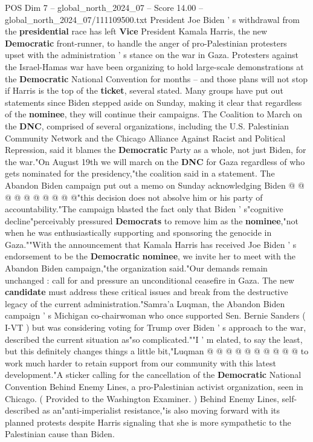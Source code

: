 \begin{textsample}{POS Dim 7 – global\_north\_2024\_07 – Score 14.00 – global\_north\_2024\_07/111109500.txt}  \label{ex:f7_pos_042}
President Joe Biden ' s withdrawal from the \textbf{presidential} race has left \textbf{Vice} President Kamala Harris, the new \textbf{Democratic} front-runner, to handle the anger of pro-Palestinian protesters upset with the administration ' s stance on the war in Gaza.
Protesters against the Israel-Hamas war have been organizing to hold large-scale demonstrations at the \textbf{Democratic} National Convention for months -- and those plans will not stop if Harris is the top of the \textbf{ticket}, several stated.
Many groups have put out statements since Biden stepped aside on Sunday, making it clear that regardless of the \textbf{nominee}, they will continue their campaigns.
The Coalition to March on the \textbf{DNC}, comprised of several organizations, including the U.S.
Palestinian Community Network and the Chicago Alliance Against Racist and Political Repression, said it blames the \textbf{Democratic} Party as a whole, not just Biden, for the war."On August 19th we will march on the \textbf{DNC} for Gaza regardless of who gets nominated for the presidency,"the coalition said in a statement.
The Abandon Biden campaign put out a memo on Sunday acknowledging Biden @ @ @ @ @ @ @ @ @ @"this decision does not absolve him or his party of accountability."The campaign blasted the fact only that Biden ' s"cognitive decline"perceivably pressured \textbf{Democrats} to remove him as the \textbf{nominee},"not when he was enthusiastically supporting and sponsoring the genocide in Gaza.""With the announcement that Kamala Harris has received Joe Biden ' s endorsement to be the \textbf{Democratic} \textbf{nominee}, we invite her to meet with the Abandon Biden campaign,"the organization said."Our demands remain unchanged : call for and pressure an unconditional ceasefire in Gaza.
The new \textbf{candidate} must address these critical issues and break from the destructive legacy of the current administration."Samra'a Luqman, the Abandon Biden campaign ' s Michigan co-chairwoman who once supported Sen.
Bernie Sanders ( I-VT ) but was considering voting for Trump over Biden ' s approach to the war, described the current situation as"so complicated.""I ' m elated, to say the least, but this definitely changes things a little bit,"Luqman @ @ @ @ @ @ @ @ @ @ to work much harder to retain support from our community with this latest development."A sticker calling for the cancellation of the \textbf{Democratic} National Convention Behind Enemy Lines, a pro-Palestinian activist organization, seen in Chicago. ( Provided to the Washington Examiner. ) Behind Enemy Lines, self-described as an"anti-imperialist resistance,"is also moving forward with its planned protests despite Harris signaling that she is more sympathetic to the Palestinian cause than Biden.

\end{textsample}
